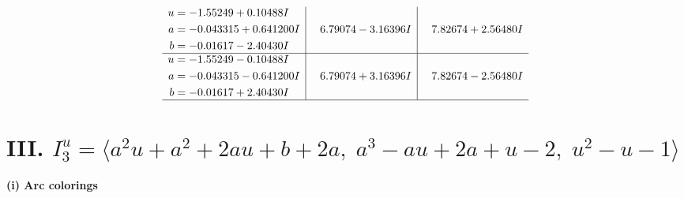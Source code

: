 \documentclass[1p]{elsarticle_modified}
\theoremstyle{definition}
\begin{document}
$$\begin{array}{c|c|c}
\begin{aligned}
u &= -1.55249 + 0.10488 I \\
a &= -0.043315 + 0.641200 I \\
b &= -0.01617 - 2.40430 I\end{aligned}
 & \phantom{-}6.79074 - 3.16396 I & \phantom{-}7.82674 + 2.56480 I \\ \hline\begin{aligned}
u &= -1.55249 - 0.10488 I \\
a &= -0.043315 - 0.641200 I \\
b &= -0.01617 + 2.40430 I\end{aligned}
 & \phantom{-}6.79074 + 3.16396 I & \phantom{-}7.82674 - 2.56480 I\\
 \hline 
 \end{array}$$\newpage\newpage\renewcommand{\arraystretch}{1}
\centering \section*{III. $I^u_{3}= \langle a^2 u+a^2+2 a u+b+2 a,\;a^3- a u+2 a+u-2,\;u^2- u-1 \rangle$}
\flushleft \textbf{(i) Arc colorings}\\
\end{document}
